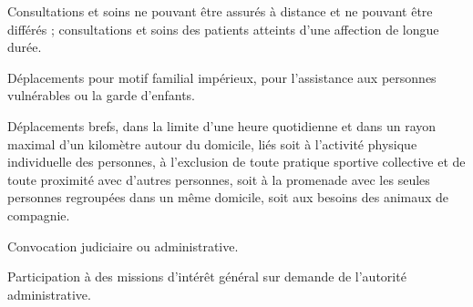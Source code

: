 \documentclass[12pt,a4paper]{article}
\begin{document}
\begin{Form}
\vspace{5mm}

\begin{minipage}{0.1\textwidth}
	\CheckBox[bordercolor=black]{}
\end{minipage}
\begin{minipage}{0.89\textwidth}
	Consultations et soins ne pouvant être assurés à distance et ne pouvant être différés ;
	consultations et soins des patients atteints d'une affection de longue durée.
\end{minipage}

\vspace{5mm}

\begin{minipage}{0.1\textwidth}
	\CheckBox[bordercolor=black]{}
\end{minipage}
\begin{minipage}{0.89\textwidth}
	Déplacements pour motif familial impérieux, pour l'assistance aux personnes
	vulnérables ou la garde d’enfants.
\end{minipage}

\vspace{5mm}

\begin{minipage}{0.1\textwidth}
	\CheckBox[bordercolor=black]{}
\end{minipage}
\begin{minipage}{0.89\textwidth}
	Déplacements brefs, dans la limite d'une heure quotidienne et dans un rayon maximal
	d'un kilomètre autour du domicile, liés soit à l'activité physique individuelle des
	personnes, à l'exclusion de toute pratique sportive collective et de toute proximité avec
	d'autres personnes, soit à la promenade avec les seules personnes regroupées dans un
	même domicile, soit aux besoins des animaux de compagnie.
\end{minipage}

\vspace{5mm}

\begin{minipage}{0.1\textwidth}
	\CheckBox[bordercolor=black]{}
\end{minipage}
\begin{minipage}{0.89\textwidth}
	Convocation judiciaire ou administrative.
\end{minipage}

\vspace{5mm}

\begin{minipage}{0.1\textwidth}
	\CheckBox[bordercolor=black]{}
\end{minipage}
\begin{minipage}{0.89\textwidth}
	Participation à des missions d'intérêt général sur demande de l'autorité administrative.
\end{minipage} \\


\end{Form}
\end{document}
